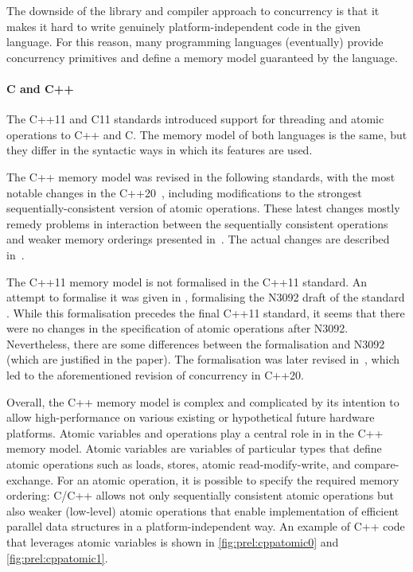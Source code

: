 The downside of the library and compiler approach to concurrency is that it
makes it hard to write genuinely platform-independent code in the given language.
For this reason, many programming languages (eventually) provide concurrency
primitives and define a memory model guaranteed by the language.

\paragraph{C and C++}
%
The C++11  and C11  standards
introduced support for threading and atomic operations to C++ and C.
The memory model of both languages is the same, but they differ in the
syntactic ways in which its features are used.

The C++ memory model was revised in the following standards, with the most
notable changes in the C++20~, including modifications to the strongest sequentially-consistent version of atomic operations.
These latest changes mostly remedy problems in interaction between the
sequentially consistent operations and weaker memory orderings presented
in~.
The actual changes are described in~.

The C++11 memory model is not formalised in the C++11 standard.
An attempt to formalise it was given in , formalising the
N3092 draft of the standard .
While this formalisation precedes the final C++11 standard, it seems that there were no changes in the specification of atomic operations after N3092.
Nevertheless, there are some differences between the formalisation and N3092
(which are justified in the paper).
The formalisation was later revised in~, which led to the aforementioned revision of concurrency in C++20.

Overall, the C++ memory model is complex and complicated by its intention to
allow high-performance on various existing or hypothetical future hardware
platforms.
Atomic variables and operations play a central role in in the C++ memory model.
Atomic variables are variables of particular types that define atomic operations
such as loads, stores, atomic read-modify-write, and compare-exchange.
For an atomic operation, it is possible to specify the required memory
ordering: C/C++ allows not only sequentially consistent atomic operations but
also weaker (low-level) atomic operations that enable implementation of
efficient parallel data structures in a platform-independent way.
An example of C++ code that leverages atomic variables is shown in \autoref{fig:prel:cppatomic0} and \autoref{fig:prel:cppatomic1}.

